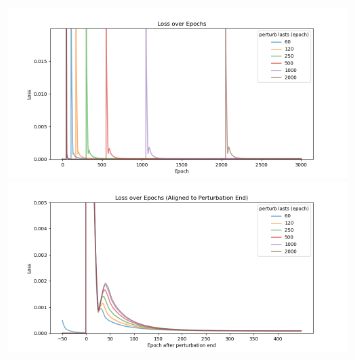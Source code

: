 \documentclass[12pt, a4paper]{article}
\begin{document}
\begin{figure}[H]
    \centering
    \includegraphics[width=0.8\textwidth]{baseline_abb05/fig/0214_abb05_perturb_loss_train.png} \\
    \includegraphics[width=0.8\textwidth]{baseline_abb05/fig/0214_abb05_perturb_loss_align.png}
\end{figure}
\end{document}
